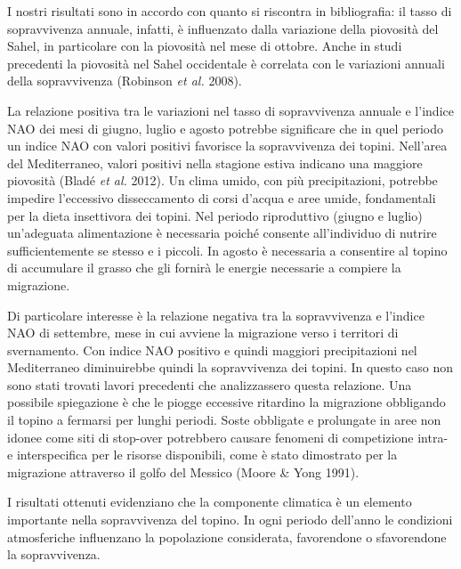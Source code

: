 I nostri risultati sono in accordo con quanto si riscontra in
bibliografia: il tasso di sopravvivenza annuale, infatti, \`e
influenzato dalla variazione della piovosit\`a del Sahel, in
particolare con la piovosit\`a nel mese di ottobre. Anche in studi
precedenti la piovosit\`a nel Sahel occidentale \`e correlata con le
variazioni annuali della sopravvivenza (Robinson \textit{et al.} 2008).

La relazione positiva tra le variazioni nel tasso di sopravvivenza
annuale e l{\textquoteright}indice NAO dei mesi di giugno, luglio e
agosto potrebbe significare che in quel periodo un indice NAO con
valori positivi favorisce la sopravvivenza dei topini.
Nell{\textquoteright}area del Mediterraneo, valori positivi nella
stagione estiva indicano una maggiore piovosit\`a (Blad\'e \textit{et
al.} 2012). Un clima umido, con pi\`u precipitazioni, potrebbe impedire
l{\textquoteright}eccessivo disseccamento di corsi
d{\textquoteright}acqua e aree umide, fondamentali per la dieta
insettivora dei topini. Nel periodo riproduttivo (giugno e luglio)
un{\textquoteright}adeguata alimentazione \`e necessaria poich\'e
consente all{\textquoteright}individuo di nutrire sufficientemente se
stesso e i piccoli. In agosto \`e necessaria a consentire al topino di
accumulare il grasso che gli fornir\`a le energie necessarie a compiere
la migrazione.

Di particolare interesse \`e la relazione negativa tra la sopravvivenza
e l{\textquoteright}indice NAO di settembre, mese in cui avviene la
migrazione verso i territori di svernamento. Con indice NAO positivo e
quindi maggiori precipitazioni nel Mediterraneo diminuirebbe quindi la
sopravvivenza dei topini. In questo caso non sono stati trovati lavori
precedenti che analizzassero questa relazione. Una possibile
spiegazione \`e che le piogge eccessive ritardino la migrazione
obbligando il topino a fermarsi per lunghi periodi. Soste obbligate e
prolungate in aree non idonee come siti di stop-over potrebbero causare
fenomeni di competizione intra- e interspecifica per le risorse
disponibili, come \`e stato dimostrato per la migrazione attraverso il
golfo del Messico (Moore \& Yong 1991). 

I risultati ottenuti evidenziano che la componente climatica \`e un
elemento importante nella sopravvivenza del topino. In ogni periodo
dell{\textquoteright}anno le condizioni atmosferiche influenzano la
popolazione considerata, favorendone o sfavorendone la sopravvivenza.\\

